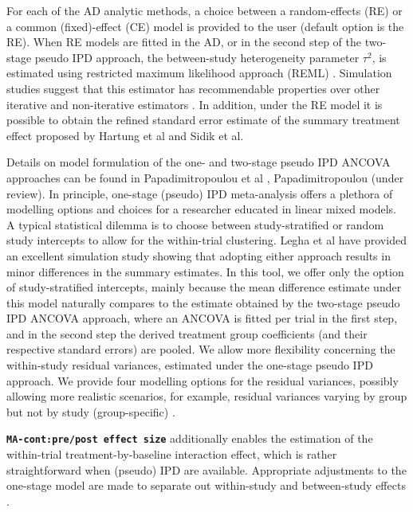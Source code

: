 \documentclass[AMA,STIX1COL]{WileyNJD-v2}
\begin{document}
For each of the AD analytic methods, a choice between a random-effects (RE) or a common (fixed)-effect (CE) model \citep{hedges1985statistical, Borenstein2009} is provided to the user (default option is the RE). When RE models are fitted in the AD, or in the second step of the two-stage pseudo IPD approach, the between-study heterogeneity parameter $\tau^2$, is estimated using restricted maximum likelihood approach (REML) \citep{raudenbush2009analyzing}. Simulation studies suggest that this estimator has recommendable properties over other iterative and non-iterative estimators \citep{viechtbauer2005bias, veroniki2016methods}. In addition, under the RE model it is possible to obtain the refined standard error estimate of the summary treatment effect proposed by Hartung et al\cite{HartungJ.Knapp2001} and Sidik et al\cite{sidik2002simple}.

Details on model formulation of the one- and two-stage pseudo IPD ANCOVA approaches can be found in Papadimitropoulou et al \cite{papadimitropoulou2020meta}, Papadimitropoulou (under review). In principle, one-stage (pseudo) IPD meta-analysis offers a plethora of modelling options and choices for a researcher educated in linear mixed models. A typical statistical dilemma is to choose between study-stratified or random study intercepts to allow for the within-trial clustering. Legha et al\cite{legha2018individual} have provided an excellent simulation study showing that adopting either approach results in minor differences in the summary estimates. In this tool, we offer only the option of study-stratified intercepts, mainly because the mean difference estimate under this model naturally compares to the estimate obtained by the two-stage pseudo IPD ANCOVA approach, where an ANCOVA is fitted per trial in the first step, and in the second step the derived treatment group coefficients (and their respective standard errors) are pooled. We allow more flexibility concerning the within-study residual variances, estimated under the one-stage pseudo IPD approach. We provide four modelling options for the residual variances, possibly allowing more realistic scenarios, for example, residual variances varying by group but not by study (group-specific) \citep{papadimitropoulou2020meta, papadimitropoulou2019one,schmid2020handbook}.

\textbf{\texttt{MA-cont:pre/post effect size}} additionally enables the estimation of the within-trial treatment-by-baseline interaction effect, which is rather straightforward when (pseudo) IPD are available. Appropriate adjustments to the one-stage model are made to separate out within-study and between-study effects \citep{hua2017one, riley2020individual}.
\end{document}
